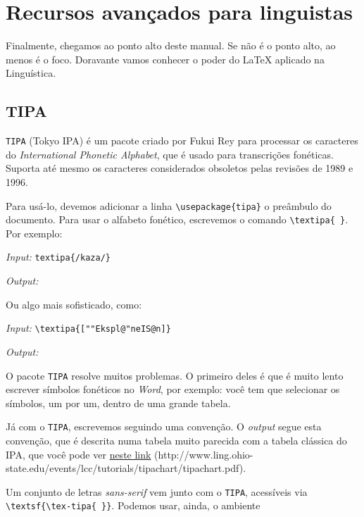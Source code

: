 \chapter{Recursos avançados para linguistas}

Finalmente, chegamos ao ponto alto deste manual. Se não é o ponto alto, ao menos é o foco. Doravante vamos conhecer o poder do \LaTeX{} aplicado na Linguística.

\section{TIPA}

\texttt{TIPA} (Tokyo IPA) é um pacote criado por Fukui Rey para processar os caracteres do \emph{International Phonetic Alphabet}, que é usado para transcrições fonéticas. Suporta até mesmo os caracteres considerados obsoletos pelas revisões de 1989 e 1996.

Para usá-lo, devemos adicionar a linha \verb+\usepackage{tipa}+ o preâmbulo do documento. Para usar o alfabeto fonético, escrevemos o comando \verb+\textipa{ }+. Por exemplo:

\begin{center}
\emph{Input:} \verb+textipa{/kaza/}+

\emph{Output:} 
\end{center}

Ou algo mais sofisticado, como:

\begin{center}
\emph{Input:} \verb+\textipa{[""Ekspl@"neIS@n]}+

\emph{Output:} 
\end{center}

O pacote \texttt{TIPA} resolve muitos problemas. O primeiro deles é que é muito lento escrever símbolos fonéticos no \emph{Word}, por exemplo: você tem que selecionar os símbolos, um por um, dentro de uma grande tabela.

Já com o \texttt{TIPA}, escrevemos seguindo uma convenção. O \emph{output} segue esta convenção, que é descrita numa tabela muito parecida com a tabela clássica do IPA, que você pode ver \href{http://www.ling.ohio-state.edu/events/lcc/tutorials/tipachart/tipachart.pdf}{neste link} (\textsf{http://www.ling.ohio-state.edu/events/lcc/tutorials/tipachart/tipachart.pdf}).

Um conjunto de letras \emph{sans-serif} vem junto com o \texttt{TIPA}, acessíveis via \verb+\textsf{\tex-tipa{ }}+. Podemos usar, ainda, o ambiente 

